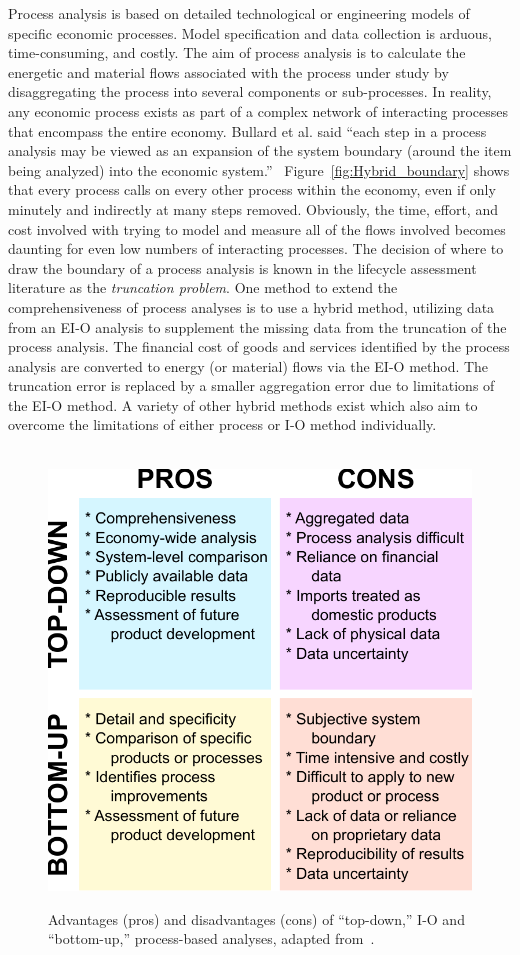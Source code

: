Process analysis is based on detailed technological
or engineering models of specific economic processes.
Model specification and data collection is arduous,
time-consuming,
and costly.
The aim of process analysis is to calculate the
energetic and material flows associated with the process
under study by disaggregating the process into
several components or sub-processes.
In reality,
any economic process exists as part of a complex network of
interacting processes that encompass the entire economy.
Bullard et al. said 
``each step in a process analysis may be viewed as 
an expansion of the system boundary 
(around the item being analyzed) 
into the economic system.''~\cite[p.~281]{Bullard:1978vd}
Figure~\ref{fig:Hybrid_boundary} shows that 
every process calls on every other process within the economy,
even if only minutely and indirectly at many steps removed.
Obviously,
the time, 
effort,
and cost involved with trying to model and
measure all of the flows involved becomes daunting
for even low numbers of interacting processes.
The decision of where to draw the boundary of
a process analysis is known in the 
lifecycle assessment literature as the 
\emph{truncation problem}.\cite{Suh2004}
One method to extend the comprehensiveness of process
analyses is to use a hybrid method,
utilizing data from an EI-O analysis to supplement the
missing data from the truncation of the process analysis.
The financial cost of goods and services identified by
the process analysis are converted to energy
(or material) flows via the EI-O method.
The truncation error is replaced by a smaller aggregation
error due to limitations of the EI-O 
method.\cite{Bullard:1978vd}
A variety of other hybrid methods exist which also aim to
overcome the limitations of either process or I-O method 
individually.\cite{Bullard:1978vd, Suh2004, Suh2002, 
Crawford2008, Zhai2010}

\begin{figure}[p]
\centering\
\includegraphics[width=0.8\linewidth]{Part_3/Chapter_Unfinished/images/Top_down_vs_bottom_up.pdf}
\caption[Top-down vs.\ bottom-up analyses]{Advantages (pros) and disadvantages (cons) of ``top-down,'' I-O and ``bottom-up,'' process-based analyses, adapted from~\cite{Hendrickson2006}.} %
\label{fig:IO_vs_process}
\end{figure}


